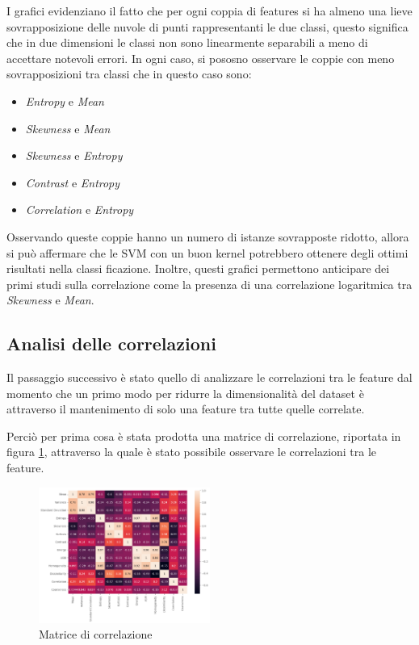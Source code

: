 I grafici evidenziano il fatto che per ogni coppia di features si ha almeno una lieve sovrapposizione
delle nuvole di punti rappresentanti le due classi, questo significa che in due 
dimensioni le classi non sono linearmente separabili a meno di accettare notevoli 
errori. In ogni caso, si pososno osservare le coppie con meno sovrapposizioni tra classi 
che in questo caso sono:
\begin{itemize}
      \item \textit{Entropy} e \textit{Mean}  
      \item \textit{Skewness} e \textit{Mean}  
      \item \textit{Skewness} e \textit{Entropy}  
      \item \textit{Contrast} e \textit{Entropy}  
      \item \textit{Correlation} e \textit{Entropy}  
\end{itemize} 
Osservando queste coppie hanno un numero di istanze sovrapposte ridotto, allora 
si può affermare che le SVM con un buon kernel potrebbero ottenere degli ottimi 
risultati nella classi ficazione.
Inoltre, questi grafici permettono anticipare dei primi studi sulla correlazione
come la presenza di una correlazione logaritmica tra \textit{Skewness} e \textit{Mean}.

\subsection{Analisi delle correlazioni} \label{sec:correlazione}
Il passaggio successivo è  stato quello di analizzare le correlazioni tra le feature
dal momento che un primo modo per ridurre la dimensionalità del dataset è attraverso
il mantenimento di solo una feature tra tutte quelle correlate.

Perciò per prima cosa è stata prodotta una matrice di correlazione, riportata in figura
\ref{fig:corr-matrix}, attraverso la quale è stato possibile osservare le correlazioni
tra le feature.

\begin{figure}[!ht]
      \centering
      \includegraphics[width=0.5\textwidth]{img/analisi/corr.png}
      \caption{Matrice di correlazione}
      \label{fig:corr-matrix}
\end{figure}

